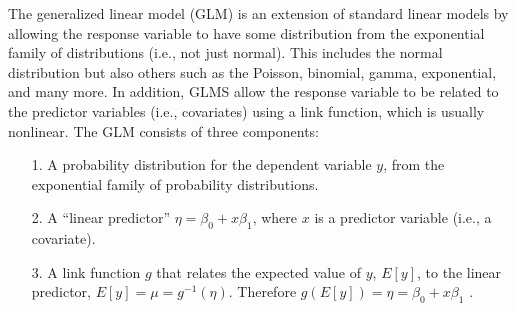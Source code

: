 The generalized linear model (GLM) is an extension of standard linear
models by allowing the response
variable to have some distribution from the exponential family of
distributions (i.e., not just normal). This includes the normal
distribution but also others such as the Poisson, binomial,
gamma, exponential, and many more. In addition, GLMS allow the
response variable to be related to the predictor variables (i.e.,
covariates) using a link function, which is usually nonlinear.  
The GLM consists of three components:
\begin{itemize}
\item[1.] A probability distribution for the dependent variable $y$,
from the exponential family of probability distributions.
\item[2.] A ``linear predictor'' $\eta = \beta_0 + x \beta_1$, where
  $x$ is a predictor variable (i.e., a covariate).
\item[3.] A link function $g$ that relates the expected value of $y$, $E[y]$, to the linear predictor, $E[y] = \mu = g^{-1}(\eta)$. Therefore $g(E[y]) = \eta = \beta_0 + x \beta_1$ .
\end{itemize}
